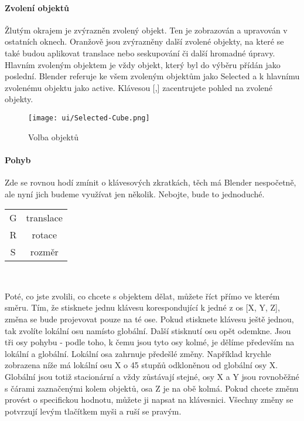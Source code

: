 \documentclass[12pt,a4paper]{report}
\begin{document}
	\paragraph{Zvolení objektů} Žlutým okrajem je zvýrazněn zvolený objekt. Ten je
	zobrazován a upravován v ostatních oknech. Oranžově jsou zvýrazněny
	další zvolené objekty, na které se také budou aplikovat translace nebo
	seskupování či další hromadné úpravy. Hlavním zvoleným objektem je
	vždy objekt, který byl do výběru přídán jako poslední. Blender referuje ke
	všem zvoleným objektům jako Selected a k hlavnímu zvolenému objektu
	jako active. Klávesou [,] zacentrujete pohled na zvolené objekty.
	
	\begin{figure}[h]
		\centering
		\texttt{[image: ui/Selected-Cube.png]}
		\caption{Volba objektů}
		\label{pic:cube-selection}
	\end{figure}

	\paragraph{Pohyb} Zde se rovnou hodí zmínit o klávesových zkratkách, těch má
Blender nespočetně, ale nyní jich budeme využívat jen několik. Nebojte,
bude to jednoduché.
	\newline \newline

	\begin{tabular}{cc}
		G & translace \\
		R & rotace \\
		S & rozměr
	\end{tabular} \\ \newline
	
	Poté, co jste zvolili, co chcete s objektem dělat, můžete říct přímo
	ve kterém směru. Tím, že stisknete jednu klávesu korespondující k jedné
	z os [X, Y, Z], změna se bude projevovat pouze na té ose. Pokud
	stisknete klávesu ještě jednou, tak zvolíte lokální osu namísto
	globální. Další stisknutí osu opět odemkne.
	Jsou tři osy pohybu - podle toho, k čemu jsou tyto osy kolmé, je dělíme
	především na lokální a globální. Lokální osa zahrnuje předešlé změny.
	Například krychle zobrazena níže má lokální osu X o 45 stupňů
	odkloněnou od globální osy X. Globální jsou totiž stacionární a vždy
	zůstávají stejné, osy X a Y jsou rovnoběžné s čárami zaznačenými kolem
	objektů, osa Z je na obě kolmá.
	Pokud chcete změnu provést o specifickou hodnotu, můžete ji napsat na
	klávesnici. Všechny změny se potvrzují levým tlačítkem myši a ruší se
	pravým.
	
\end{document}
